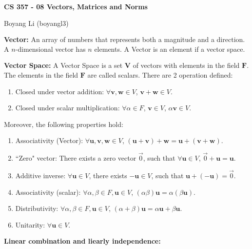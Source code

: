 \documentclass[12pt]{article}
\begin{document}
\begin{center}\Large\bf 
CS 357 - 08 Vectors, Matrices and Norms\\
\end{center}
\begin{center}
Boyang Li (boyangl3)
\end{center}

\medskip
\noindent \textbf{Vector:} An array of numbers that represents both a magnitude and a direction. A $n$-dimensional vector has $n$ elements. A Vector is an element if a vector space.

\medskip
\noindent \textbf{Vector Space:} A Vector Space is a set $\boldsymbol{V}$ of vectors with elements in the field $\boldsymbol{F}$. The elements in the field $\boldsymbol{F}$ are called scalars. There are 2 operation defined:
    \begin{enumerate}
        \item Closed under vector addition: $\forall \mathbf{v},\mathbf{w} \in V$, $\mathbf{v} + \mathbf{w} \in V$.
        \item Closed under scalar multiplication: $\forall \alpha \in F$, $\mathbf{v} \in V$, $\alpha \mathbf{v} \in V$.
    \end{enumerate}
Moreover, the following properties hold:
    \begin{enumerate}
        \item Associativity (Vector): $\forall \mathbf{u}, \mathbf{v}, \mathbf{w} \in V$, $(\mathbf{u} + \mathbf{v}) + \mathbf{w} = \mathbf{u} + (\mathbf{v}+\mathbf{w})$.
        \item ``Zero" vector: There exists a zero vector $\vec{0}$, such that $\forall \mathbf{u} \in V$, $\vec{0} + \mathbf{u} = \mathbf{u}$.
        \item Additive inverse: $\forall \mathbf{u} \in V$, there exists $-\mathbf{u} \in V$, such that $\mathbf{u} + (-\mathbf{u}) = \vec{0}$.
        \item Associativity (scalar): $\forall \alpha, \beta \in F, \mathbf{u} \in V$, $(\alpha \beta) \mathbf{u} = \alpha (\beta \mathbf{u})$.
        \item Distributivity: $\forall \alpha, \beta \in F, \mathbf{u} \in V$, $(\alpha + \beta) \mathbf{u} = \alpha \mathbf{u} + \beta \mathbf{u}$.
        \item Unitarity: $\forall \mathbf{u} \in V$.
    \end{enumerate}

\medskip
\noindent \textbf{Linear combination and liearly independence:}
\end{document}

